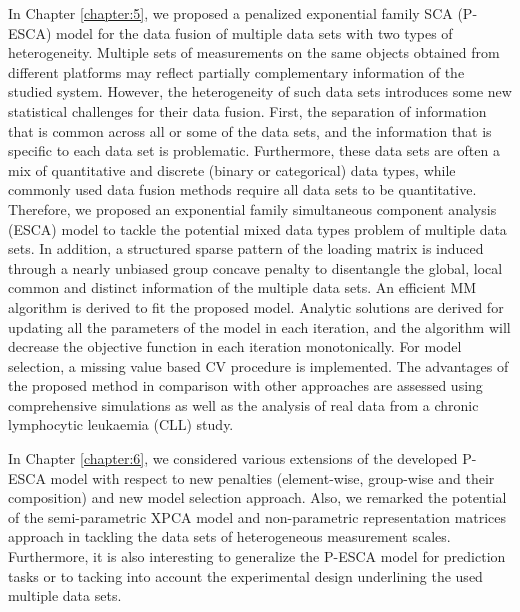 In Chapter \ref{chapter:5}, we proposed a penalized exponential family SCA (P-ESCA) model for the data fusion of multiple data sets with two types of heterogeneity. Multiple sets of measurements on the same objects obtained from different platforms may reflect partially complementary information of the studied system. However, the heterogeneity of such data sets introduces some new statistical challenges for their data fusion. First, the separation of information that is common across all or some of the data sets, and the information that is specific to each data set is problematic. Furthermore, these data sets are often a mix of quantitative and discrete (binary or categorical) data types, while commonly used data fusion methods require all data sets to be quantitative. Therefore, we proposed an exponential family simultaneous component analysis (ESCA) model to tackle the potential mixed data types problem of multiple data sets. In addition, a structured sparse pattern of the loading matrix is induced through a nearly unbiased group concave penalty to disentangle the global, local common and distinct information of the multiple data sets. An efficient MM algorithm is derived to fit the proposed model. Analytic solutions are derived for updating all the parameters of the model in each iteration, and the algorithm will decrease the objective function in each iteration monotonically. For model selection, a missing value based CV procedure is implemented. The advantages of the proposed method in comparison with other approaches are assessed using comprehensive simulations as well as the analysis of real data from a chronic lymphocytic leukaemia (CLL) study.

In Chapter \ref{chapter:6}, we considered various extensions of the developed P-ESCA model with respect to new penalties (element-wise, group-wise and their composition) and new model selection approach. Also, we remarked the potential of the semi-parametric XPCA model and non-parametric representation matrices approach in tackling the data sets of heterogeneous measurement scales. Furthermore, it is also interesting to generalize the P-ESCA model for prediction tasks or to tacking into account the experimental design underlining the used multiple data sets.



